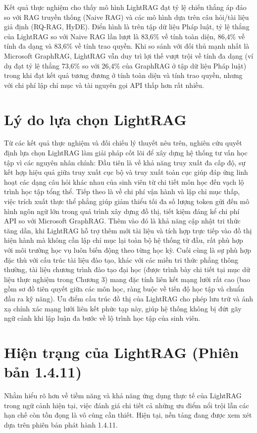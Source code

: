 \indent Kết quả thực nghiệm cho thấy mô hình LightRAG đạt tỷ lệ chiến thắng áp đảo so với RAG truyền thống (Naive RAG) và các mô hình dựa trên câu hỏi/tài liệu giả định (RQ-RAG, HyDE). Điển hình là trên tập dữ liệu Pháp luật, tỷ lệ thắng của LightRAG so với Naive RAG lần lượt là 83,6\% về tính toàn diện, 86,4\% về tính đa dạng và 83,6\% về tính trao quyền. Khi so sánh với đối thủ mạnh nhất là Microsoft GraphRAG, LightRAG vẫn duy trì lợi thế vượt trội về tính đa dạng (ví dụ đạt tỷ lệ thắng 73,6\% so với 26,4\% của GraphRAG ở tập dữ liệu Pháp luật) trong khi đạt kết quả tương đương ở tính toàn diện và tính trao quyền, nhưng với chi phí lập chỉ mục và tài nguyên gọi API thấp hơn rất nhiều.

\section{Lý do lựa chọn LightRAG}
\indent Từ các kết quả thực nghiệm và đối chiếu lý thuyết nêu trên, nghiên cứu quyết định lựa chọn LightRAG làm giải pháp cốt lõi để xây dựng hệ thống tư vấn học tập vì các nguyên nhân chính: Đầu tiên là về khả năng truy xuất đa cấp độ, sự kết hợp hiệu quả giữa truy xuất cục bộ và truy xuất toàn cục giúp đáp ứng linh hoạt các dạng câu hỏi khác nhau của sinh viên từ chi tiết môn học đến vạch lộ trình học tập tổng thể. Tiếp theo là về chi phí vận hành và lập chỉ mục thấp, việc trích xuất thực thể phẳng giúp giảm thiểu tối đa số lượng token gửi đến mô hình ngôn ngữ lớn trong quá trình xây dựng đồ thị, tiết kiệm đáng kể chi phí API so với Microsoft GraphRAG. Thêm vào đó là khả năng cập nhật tri thức tăng dần, khi LightRAG hỗ trợ thêm mới tài liệu và tích hợp trực tiếp vào đồ thị hiện hành mà không cần lập chỉ mục lại toàn bộ hệ thống từ đầu, rất phù hợp với môi trường học vụ luôn biến động theo từng học kỳ. Cuối cùng là sự phù hợp đặc thù với cấu trúc tài liệu đào tạo, khác với các miền tri thức phẳng thông thường, tài liệu chương trình đào tạo đại học (được trình bày chi tiết tại mục dữ liệu thực nghiệm trong Chương 3) mang đặc tính liên kết mạng lưới rất cao (bao gồm sơ đồ tiên quyết giữa các môn học, ràng buộc về tiến độ học tập và chuẩn đầu ra kỹ năng). Ưu điểm cấu trúc đồ thị của LightRAG cho phép lưu trữ và ánh xạ chính xác mạng lưới liên kết phức tạp này, giúp hệ thống không bị đứt gãy ngữ cảnh khi lập luận đa bước về lộ trình học tập của sinh viên.

\section{Hiện trạng của LightRAG (Phiên bản 1.4.11)}
Nhằm hiểu rõ hơn về tiềm năng và khả năng ứng dụng thực tế của LightRAG trong ngữ cảnh hiện tại, việc đánh giá chi tiết cả những ưu điểm nổi trội lẫn các hạn chế còn tồn đọng là vô cùng cần thiết. Hiện tại, nền tảng đang được xem xét dựa trên phiên bản phát hành 1.4.11.

